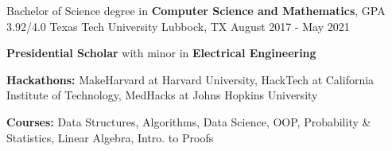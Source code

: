 
\begin{cventries}
  \cventry
    {Bachelor of Science degree in \textbf{Computer Science and Mathematics}, GPA 3.92/4.0} %
    {Texas Tech University} %
    {Lubbock, TX} %
    {August 2017 - May 2021} %
    {
      \begin{cvitems} %
         \item { \textbf{Presidential Scholar} with minor in \textbf{Electrical Engineering}}
         \item {\textbf{Hackathons:} MakeHarvard at Harvard University, HackTech at California Institute of Technology, MedHacks at Johns Hopkins University }
         \item {\textbf{Courses: } Data Structures, Algorithms, Data Science, OOP, Probability \& Statistics, Linear Algebra, Intro. to Proofs}
         \end{cvitems}
    }
\end{cventries}
